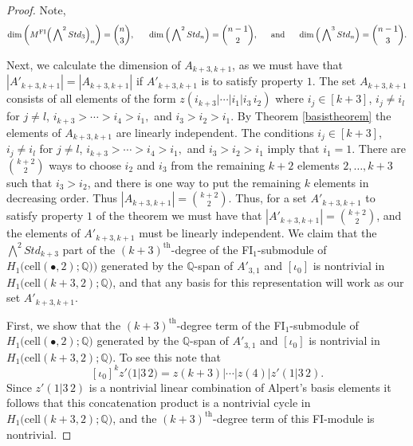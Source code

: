 \documentclass[12py]{amsart}%
\theoremstyle{definition}\newtheorem{definition}[thm]{Definition}
\theoremstyle{definition}
\newcommand{\Q}{\ensuremath{\mathbb{Q}}}
\begin{document}
\begin{proof}
Note,
\[
\dim\bigg(M^{\text{FI}}\Big(\bigwedge\nolimits^{2}Std_{3}\Big)_{n}\bigg) =\binom{n}{3},\indent \dim\Big(\bigwedge\nolimits^{2}Std_{n}\Big)=\binom{n-1}{2},\indent\text{and}\indent\dim\Big(\bigwedge\nolimits^{3}Std_{n}\Big)=\binom{n-1}{3}.
\]

Next, we calculate the dimension of $A_{k+3,k+1}$, as we must have that $|A'_{k+3,k+1}|=|A_{k+3,k+1}|$ if $A'_{k+3,k+1}$ is to satisfy property $1$. The set $A_{k+3,k+1}$ consists of all elements of the form $z(i_{k+3}|\cdots|i_{1}|i_{3}\,i_{2})$ where $i_{j}\in [k+3]$, $i_{j}\neq i_{l}$ for $j\neq l$, $i_{k+3}>\cdots>i_{4}>i_{1},$ and $i_{3}>i_{2}>i_{1}$. By Theorem \ref{basistheorem} the elements of $A_{k+3,k+1}$ are linearly independent. The conditions $i_{j}\in [k+3]$, $i_{j}\neq i_{l}$ for $j\neq l$, $i_{k+3}>\cdots>i_{4}>i_{1},$ and $i_{3}>i_{2}>i_{1}$ imply that $i_{1}=1$. There are $\binom{k+2}{2}$ ways to choose $i_{2}$ and $i_{3}$ from the remaining $k+2$ elements $2,\dots, k+3$ such that $i_{3}>i_{2}$, and there is one way to put the remaining $k$ elements in decreasing order. Thus $|A_{k+3,k+1}|=\binom{k+2}{2}$. Thus, for a set $A'_{k+3,k+1}$ to satisfy property $1$ of the theorem we must have that $|A'_{k+3,k+1}|=\binom{k+2}{2}$, and the elements of $A'_{k+3,k+1}$ must be linearly independent. We claim that the $\bigwedge^{2}Std_{k+3}$ part of the $(k+3)^{\text{th}}$-degree of the FI$_{1}$-submodule of $H_{1}\big(\text{cell}(\bullet, 2);\Q)\big)$ generated by the $\Q$-span of $A'_{3,1}$ and $[\iota_{0}]$ is nontrivial in $H_{1}\big(\text{cell}(k+3,2);\Q\big)$, and that any basis for this representation will work as our set $A'_{k+3,k+1}$.

First, we show that the $(k+3)^{\text{th}}$-degree term of the FI$_{1}$-submodule of $H_{1}\big(\text{cell}(\bullet,2);\Q\big)$ generated by the $\Q$-span of $A'_{3,1}$ and $[\iota_{0}]$ is nontrivial in $H_{1}\big(\text{cell}(k+3,2);\Q\big)$. To see this note that 
\[
[\iota_{0}]^{k}z'(1|3\,2)=z(k+3)|\cdots|z(4)|z'(1|3\,2).
\]
Since $z'(1|3\,2)$ is a nontrivial linear combination of Alpert's basis elements it follows that this concatenation product is a nontrivial cycle in $H_{1}\big(\text{cell}(k+3,2);\Q\big)$, and the $(k+3)^{\text{th}}$-degree term of this FI-module is nontrivial.


\end{proof}
\end{document}
